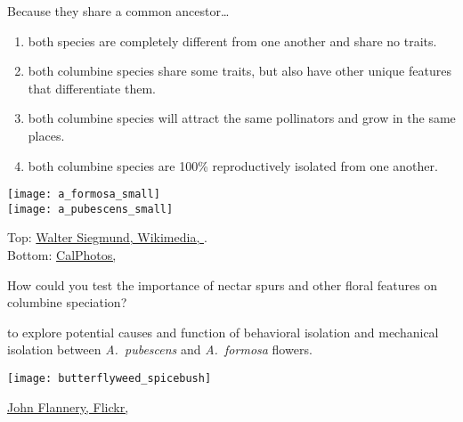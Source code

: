 \documentclass[t,handout]{beamer}  %
\newcommand{\ques}[1]{\highlight{\textsc{q#1:}}}
\begin{document}
\begin{frame}[t]{\ques8 Because they share a common ancestor\dots}
	
	\begin{multicols}{2}
		\begin{enumerate}
			\item both species are completely different from one another and share no traits. 
			
			\item \alert<2>{both columbine species share some traits, but also have other unique features that differentiate them.}
			
			\item both columbine species will attract the same pollinators and grow in the same places.
			
			\item both columbine species are 100\% reproductively isolated from one another.
		\end{enumerate}

	\columnbreak

		{\centering
		\texttt{[image: a\_formosa\_small]}\\
		\texttt{[image: a\_pubescens\_small]}\\
		}
	\end{multicols}

	\vfilll
	
	\hfill \tiny Top: \href{http://species.wikimedia.org/wiki/File:Aquilegia_formosa_14962.JPG}{Walter Siegmund, Wikimedia, }. \\ \hfill Bottom: \href{http://calphotos.berkeley.edu/cgi/img_query?enlarge=0000+0000+1209+2492
}{CalPhotos, }
\end{frame}
%
\begin{frame}[t]{How could you test the importance of nectar spurs and other floral features on columbine speciation?}
	
	\begin{multicols}{2}

	\hangpara {} to explore potential causes and function of behavioral isolation and mechanical isolation between \textit{A.~pubescens} and \textit{A.~formosa} flowers.

	\columnbreak
	
		\texttt{[image: butterflyweed\_spicebush]}
	\end{multicols}

	\vfilll
	
	\hfill \tiny \href{https://www.flickr.com/photos/drphotomoto/3638805249}{John Flannery, Flickr, }
\end{frame}
\end{document}

